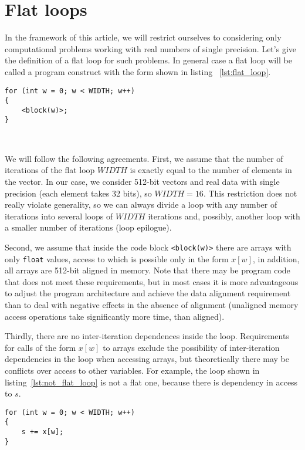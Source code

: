 \documentclass[
11pt,%
tightenlines,%
twoside,%
onecolumn,%
nofloats,%
nobibnotes,%
nofootinbib,%
superscriptaddress,%
noshowpacs,%
centertags]%
{revtex4}
\begin{document}
\section{Flat loops}

In the framework of this article, we will restrict ourselves to considering only computational problems working with real numbers of single precision.
Let's give the definition of a flat loop for such problems.
In general case a flat loop will be called a program construct with the form shown in listing ~\ref{lst:flat_loop}.

\begin{lstlisting}[caption={General view of a flat loop.},label={lst:flat_loop}]
for (int w = 0; w < WIDTH; w++)
{
    <block(w)>;
}
\end{lstlisting}

\

We will follow the following agreements.
First, we assume that the number of iterations of the flat loop $WIDTH$ is exactly equal to the number of elements in the vector.
In our case, we consider 512-bit vectors and real data with single precision (each element takes 32 bits), so $WIDTH = 16$.
This restriction does not really violate generality, so we can always divide a loop with any number of iterations into several loops of $WIDTH$ iterations and, possibly, another loop with a smaller number of iterations (loop epilogue).

Second, we assume that inside the code block \texttt{<block(w)>} there are arrays with only \texttt{float} values, access to which is possible only in the form $x[w]$, in addition, all arrays are 512-bit aligned in memory.
Note that there may be program code that does not meet these requirements, but in most cases it is more advantageous to adjust the program architecture and achieve the data alignment requirement than to deal with negative effects in the absence of alignment (unaligned memory access operations take significantly more time, than aligned).

Thirdly, there are no inter-iteration dependences inside the loop.
Requirements for calls of the form $x[w]$ to arrays exclude the possibility of inter-iteration dependencies in the loop when accessing arrays, but theoretically there may be conflicts over access to other variables.
For example, the loop shown in listing~\ref{lst:not_flat_loop} is not a flat one, because there is dependency in access to $s$.
\begin{lstlisting}[caption={Simple example of a non-flat loop.},label={lst:not_flat_loop}]
for (int w = 0; w < WIDTH; w++)
{
    s += x[w];
}
\end{lstlisting}
\end{document}
